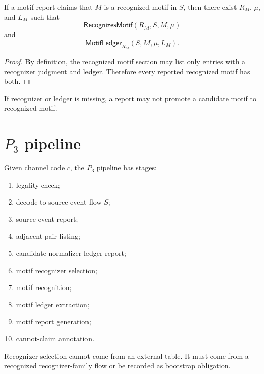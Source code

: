 \begin{theorem}
\label{thm:motif-report-soundness}
If a motif report claims that $M$ is a recognized motif in $S$, then there exist $R_M$, $\mu$, and $L_M$ such that
$$
  \mathsf{RecognizesMotif}(R_M,S,M,\mu)
$$
and
$$
  \mathsf{MotifLedger}_{R_M}(S,M,\mu,L_M).
$$
\end{theorem}

\begin{proof}
By definition, the recognized motif section may list only entries with a recognizer judgment and ledger. Therefore every reported recognized motif has both.
\end{proof}

\begin{corollary}
\label{cor:motif-report-cannot-invent}
If recognizer or ledger is missing, a report may not promote a candidate motif to recognized motif.
\end{corollary}

\section{$P_3$ pipeline}
\label{sec:motif-report-pipeline}

\begin{definition}[$P_3$ pipeline]
\label{def:motif-report-p3-pipeline}
Given channel code $c$, the $P_3$ pipeline has stages:
\begin{enumerate}
\item legality check;
\item decode to source event flow $S$;
\item source-event report;
\item adjacent-pair listing;
\item candidate normalizer ledger report;
\item motif recognizer selection;
\item motif recognition;
\item motif ledger extraction;
\item motif report generation;
\item cannot-claim annotation.
\end{enumerate}
Recognizer selection cannot come from an external table. It must come from a recognized recognizer-family flow or be recorded as bootstrap obligation.
\end{definition}

